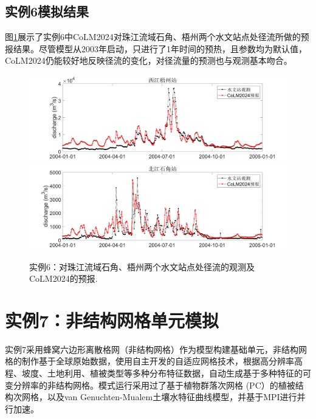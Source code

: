 \subsection{实例6模拟结果}

图\ref{fig:fig_pearlriver_discharge}展示了实例6中CoLM2024对珠江流域石角、梧州两个水文站点处径流所做的预报结果。尽管模型从2003年启动，只进行了1年时间的预热，且参数均为默认值，CoLM2024仍能较好地反映径流的变化，对径流量的预测也与观测基本吻合。

\begin{figure}[htpb]
    \centering
    \includegraphics[width=\textwidth]{figures/Example06_pearl_wuzhou_discharge.jpg}
    \includegraphics[width=\textwidth]{figures/Example06_pearl_shijiao_discharge.jpg}
    \caption{实例6：对珠江流域石角、梧州两个水文站点处径流的观测及CoLM2024的预报.}
    \label{fig:fig_pearlriver_discharge}
\end{figure}

\section{实例7：非结构网格单元模拟}

实例7采用蜂窝六边形离散格网（非结构网格）作为模型构建基础单元，非结构网格的制作基于全球原始数据，使用自主开发的自适应网格技术，根据高分辨率高程、坡度、土地利用、植被类型等多种分布特征数据，自动生成基于多种特征的可变分辨率的非结构网格。模式运行采用过了基于植物群落次网格 (PC）的植被结构次网格，以及van Genuchten-Mualem土壤水特征曲线模型，并基于MPI进行并行加速。

